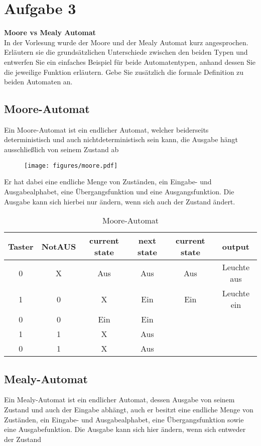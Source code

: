 \documentclass[12pt,a4paper,ngerman]{article}
\begin{document}
\pagebreak


\section{Aufgabe 3}
\begin{framed}
\textbf{Moore vs Mealy Automat}\\
In der Vorlesung wurde der Moore und der Mealy Automat kurz angesprochen. Erläutern sie die grundsätzlichen Unterschiede zwischen den beiden Typen und entwerfen Sie ein einfaches Beispiel für beide Automatentypen, anhand dessen Sie die jeweilige Funktion erläutern. Gebe Sie zusätzlich die formale Definition zu beiden Automaten an. 
\end{framed}

\subsection*{Moore-Automat}
Ein Moore-Automat ist ein endlicher Automat, welcher beiderseits deterministisch und auch nichtdeterministisch sein kann, die Ausgabe hängt ausschließlich von seinem Zustand ab

\begin{figure}[h!]
\centering
\texttt{[image: figures/moore.pdf]} 
\end{figure}
Er hat dabei eine endliche Menge von Zuständen, ein Eingabe- und Ausgabealphabet, eine Übergangsfunktion und eine Ausgangsfunktion. Die Ausgabe kann sich hierbei nur ändern, wenn sich auch der Zustand ändert. 

\begin{table}[h!]
  \begin{center}
    \begin{tabular}{| c | c | c | c ||| c | c|}
    \hline
    Taster  & NotAUS & current state & next state & current state & output  \\ \hline \hline
    0 & X & Aus & Aus & Aus & Leuchte aus \\ \hline
    1 & 0 & X & Ein & Ein & Leuchte ein \\ \hline
    0 & 0 & Ein & Ein &  &  \\ \hline
    1 & 1 & X & Aus &  &  \\ \hline
    0 & 1 & X & Aus &  &  \\ \hline
    \end{tabular}
  \end{center}
  \caption{Moore-Automat}
\end{table}
\pagebreak
\subsection*{Mealy-Automat}
Ein Mealy-Automat ist ein endlicher Automat, dessen Ausgabe von seinem Zustand und auch der Eingabe abhängt, auch er besitzt eine endliche Menge von Zuständen, ein Eingabe- und Ausgabealphabet, eine Übergangsfunktion sowie eine Ausgabefunktion. Die Ausgabe kann sich hier ändern, wenn sich entweder der Zustand
\end{document}
